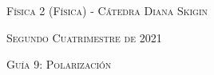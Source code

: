 \documentclass[11pt,spanish]{article}
\begin{document}
    \begin{center}
    \textsc{\large Física 2 (Física) - Cátedra Diana Skigin}
    \par\end{center}{\large \par}
    
    \begin{center}
    \textsc{\large Segundo Cuatrimestre de 2021}
    \par\end{center}{\large \par}
    
    \begin{center}
    \textsc{\large Guía 9: Polarización}
    \par\end{center}{\large \par}
\end{document}

